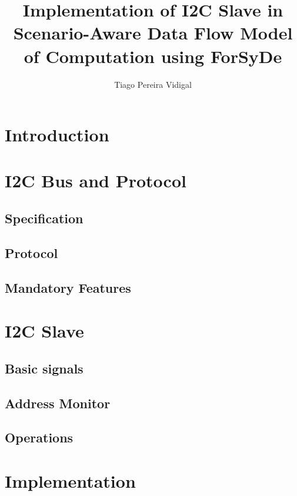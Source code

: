 \title{Implementation of I2C Slave in Scenario-Aware Data Flow Model of Computation using ForSyDe}
\author{Tiago Pereira Vidigal}

\section{Introduction}

\section{I2C Bus and Protocol}
\subsection{Specification}
\subsection{Protocol}
\subsection{Mandatory Features}

\section{I2C Slave}
\subsection{Basic signals}
\subsection{Address Monitor}
\subsection{Operations}

\section{Implementation}
